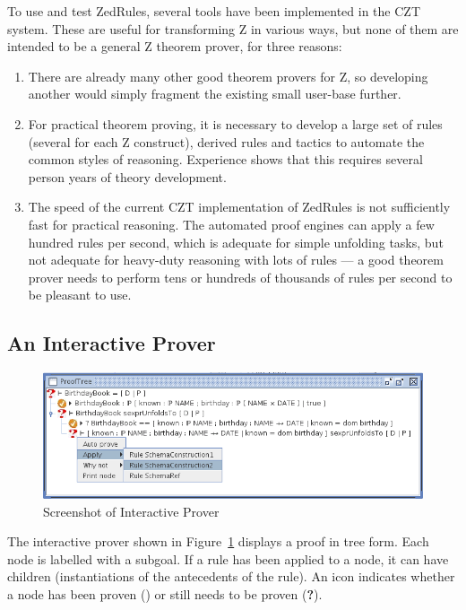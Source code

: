 \documentclass{entcs}
\begin{document}
To use and test ZedRules, several tools have been implemented in the
CZT system.  These are useful for transforming Z in various ways, but
none of them are intended to be a general Z theorem prover, for three
reasons:
\begin{enumerate}
\item There are already many other good theorem provers for Z, so
  developing another would simply fragment the existing small
  user-base further.
\item For practical theorem proving, it is necessary to develop a
  large set of rules (several for each Z construct), derived rules and
  tactics to automate the common styles of reasoning.  Experience
  shows that this requires several person years of theory development.
\item The speed of the current CZT implementation of ZedRules is not
  sufficiently fast for practical reasoning.  The automated proof
  engines can apply a few hundred rules per second, which is adequate
  for simple unfolding tasks, but not adequate for heavy-duty
  reasoning with lots of rules --- a good theorem prover needs to
  perform tens or hundreds of thousands of rules per second to be
  pleasant to use.
\end{enumerate}


\subsection{An Interactive Prover}

\begin{figure}[htbp]
  \centering
  \includegraphics[width=\textwidth]{cztprover1}
  \caption{Screenshot of Interactive Prover}
  \label{fig:cztprover}
\end{figure}

The interactive prover shown in Figure~\ref{fig:cztprover} displays a
proof in tree form.  Each node is labelled with a subgoal.  If a rule
has been applied to a node, it can have children (instantiations of
the antecedents of the rule).  An icon indicates whether a node has
been proven () or still needs to be proven ({\bf ?}).
\end{document}
